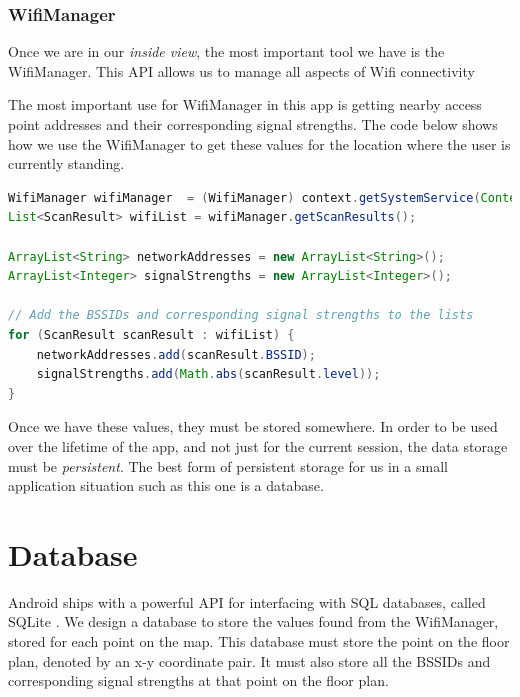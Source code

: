 \documentclass[10.8pt]{article}
\begin{document}
\subsubsection*{WifiManager}

Once we are in our \textit{inside view}, the most important tool we have is the WifiManager. This API allows us to manage all aspects of Wifi connectivity

The most important use for WifiManager in this app is getting nearby access point addresses and their corresponding signal strengths. The code below shows how we use the WifiManager to get these values for the location where the user is currently standing.    

\vspace{1em}      

\begin{lstlisting}[language=java,caption=Get BSSID values and corresponding signal strengths at current location via the WifiManager API]
WifiManager wifiManager  = (WifiManager) context.getSystemService(Context.WIFI_SERVICE);
List<ScanResult> wifiList = wifiManager.getScanResults();

ArrayList<String> networkAddresses = new ArrayList<String>();
ArrayList<Integer> signalStrengths = new ArrayList<Integer>();

// Add the BSSIDs and corresponding signal strengths to the lists
for (ScanResult scanResult : wifiList) {
    networkAddresses.add(scanResult.BSSID);
    signalStrengths.add(Math.abs(scanResult.level));
}
\end{lstlisting}

Once we have these values, they must be stored somewhere. In order to be used over the lifetime of the app, and not just for the current session, the data storage must be \textit{persistent}. The best form of persistent storage for us in a small application situation such as this one is a database.

\section*{Database}

Android ships with a powerful API for interfacing with SQL databases, called SQLite \cite{sqlite_api}. We design a database to store the values found from the WifiManager, stored for each point on the map. This database must store the point on the floor plan, denoted by an x-y coordinate pair. It must also store all the BSSIDs and corresponding signal strengths at that point on the floor plan.
\end{document}
